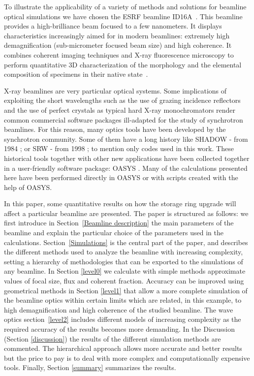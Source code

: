 \documentclass{iucr}              %
\begin{document}
To illustrate the applicability of a variety of methods and solutions for beamline optical simulations we have chosen the ESRF beamline ID16A~\cite{ID16A}. This beamline provides a high-brilliance beam focused to a few nanometers. It displays characteristics increasingly aimed for in modern beamlines: extremely high demagnification (sub-micrometer focused beam size) and high coherence. It combines coherent imaging techniques and X-ray fluorescence microscopy to perform quantitative 3D characterization of the morphology and the elemental composition of specimens in their native state~\cite{XRFID16A}.

X-ray beamlines are very particular optical systems. Some implications of exploiting the short wavelengths such as the use of grazing incidence reflectors and the use of perfect crystals as typical hard X-ray monochromators render common commercial software packages ill-adapted for the study of synchrotron beamlines. For this reason, many optics tools have been developed by the synchrotron community. Some of them have a long history like SHADOW - from 1984 \cite{firstShadow}; or SRW - from 1998 \cite{codeSRW}; to mention only codes used in this work. These historical tools together with other new applications have been collected together in a user-friendly software package: OASYS \cite{codeOASYS}. Many of the calculations presented here have been performed directly in OASYS or with scripts created with the help of OASYS. 

 In this paper, some quantitative results on how the storage ring upgrade will affect a particular beamline are presented. The paper is structured as follows: we first introduce in Section~\ref{Beamline description} the main parameters of the beamline and explain the particular choice of the parameters used in the calculations. Section~\ref{Simulations} is the central part of the paper, and describes the different methods used to analyze the beamline with increasing complexity, setting a hierarchy of methodologies that can be exported to the simulations of any beamline. In Section \ref{level0} we calculate with simple methods approximate values of focal size, flux and coherent fraction. Accuracy can be improved using geometrical methods in Section \ref{level1} that allow a more complete simulation of the beamline optics within certain limits which are related, in this example, to high demagnification and high coherence of the studied beamline. The wave optics section~\ref{level2} includes different models of increasing complexity as the required accuracy of the results becomes more demanding. In the Discussion (Section \ref{discussion}) the results of the different simulation methods are commented. The hierarchical approach allows more accurate and better results but the price to pay is to deal with more complex and computationally expensive tools. Finally, Section \ref{summary} summarizes the results.
\end{document}

